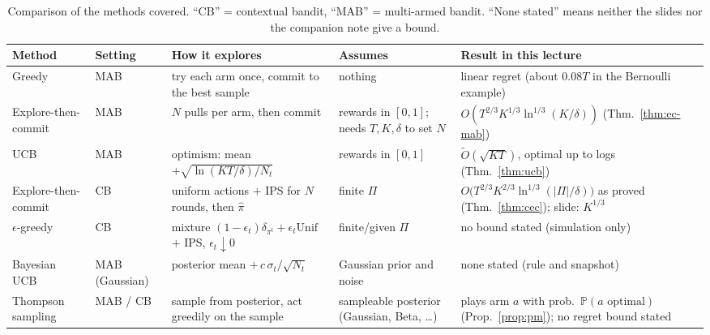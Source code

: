 \documentclass[11pt,a4paper]{article}
\newcommand{\Prob}{\mathbb{P}}
\newcommand{\Unif}{\mathrm{Unif}}
\theoremstyle{plain}
\theoremstyle{definition}
\theoremstyle{remark}
\begin{document}
\begin{table}[ht]
\centering\small
\renewcommand{\arraystretch}{1.25}
\begin{tabular}{>{\raggedright\arraybackslash}p{2.2cm}>{\raggedright\arraybackslash}p{1.35cm}>{\raggedright\arraybackslash}p{3.9cm}>{\raggedright\arraybackslash}p{2.4cm}>{\raggedright\arraybackslash}p{4.05cm}}
\toprule
\textbf{Method} & \textbf{Setting} & \textbf{How it explores} & \textbf{Assumes} & \textbf{Result in this lecture}\\\midrule
Greedy & MAB & try each arm once, commit to the best sample & nothing & linear regret (about $0.08T$ in the Bernoulli example)\\
Explore-then-commit & MAB & $N$ pulls per arm, then commit & rewards in $[0,1]$; needs $T,K,\delta$ to set $N$ & $O(T^{2/3}K^{1/3}\ln^{1/3}(K/\delta))$ (Thm.~\ref{thm:ec-mab})\\
UCB & MAB & optimism: mean $+\sqrt{\ln(KT/\delta)/N_t}$ & rewards in $[0,1]$ & $\widetilde O(\sqrt{KT})$, optimal up to logs (Thm.~\ref{thm:ucb})\\
Explore-then-commit & CB & uniform actions $+$ IPS for $N$ rounds, then $\hat\pi$ & finite $\Pi$ & $O\bigl(T^{2/3}K^{2/3}\ln^{1/3}(|\Pi|/\delta)\bigr)$ as proved (Thm.~\ref{thm:cec}); slide: $K^{1/3}$\\
$\epsilon$-greedy & CB & mixture $(1-\epsilon_t)\delta_{\pi^t}+\epsilon_t\Unif$ $+$ IPS, $\epsilon_t\downarrow0$ & finite/given $\Pi$ & no bound stated (simulation only)\\
Bayesian UCB & MAB (Gaussian) & posterior mean $+\,c\,\sigma_t/\sqrt{N_t}$ & Gaussian prior and noise & none stated (rule and snapshot)\\
Thompson sampling & MAB / CB & sample from posterior, act greedily on the sample & sampleable posterior (Gaussian, Beta, \dots) & plays arm $a$ with prob.\ $\Prob(a\text{ optimal})$ (Prop.~\ref{prop:pm}); no regret bound stated\\\bottomrule
\end{tabular}
\caption{Comparison of the methods covered. ``CB'' = contextual bandit, ``MAB'' = multi-armed bandit. ``None stated'' means neither the slides nor the companion note give a bound.}
\end{table}
\end{document}
